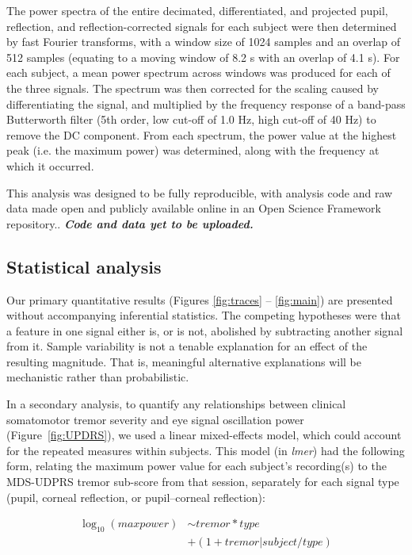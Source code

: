 \documentclass[jou,a4paper]{apa6}
\begin{document}
The power spectra of the entire decimated, differentiated, and projected pupil, reflection, and reflection-corrected signals for each subject were then determined by fast Fourier transforms, with a window size of 1024 samples and an overlap of 512 samples (equating to a moving window of 8.2 s with an overlap of 4.1 s). For each subject, a mean power spectrum across windows was produced for each of the three signals. The spectrum was then corrected for the scaling caused by differentiating the signal, and multiplied by the frequency response of a band-pass Butterworth filter (5th order, low cut-off of 1.0 Hz, high cut-off of 40 Hz) to remove the DC component. From each spectrum, the power value at the highest peak (i.e. the maximum power) was determined, along with the frequency at which it occurred.

This analysis was designed to be fully reproducible, with analysis code and raw data made open and publicly available online in an Open Science Framework repository.\citep{MacAskill2016Investigating-o}. \textbf{\textit{Code and data yet to be uploaded.}}

\subsection{Statistical analysis}
Our primary quantitative results (Figures \ref{fig:traces} -- \ref{fig:main}) are presented without accompanying inferential statistics. The competing hypotheses were that a feature in one signal either is, or is not, abolished by subtracting another signal from it. Sample variability is not a tenable explanation for an effect of the resulting magnitude. That is, meaningful alternative explanations will be mechanistic rather than probabilistic.

In a secondary analysis, to quantify any relationships between clinical somatomotor tremor severity and eye signal oscillation power (Figure~\ref{fig:UPDRS}), we used a linear mixed-effects model, which could account for the repeated measures within subjects. This model (in \textit{lmer}) had the following form, relating the maximum power value for each subject's recording(s) to the MDS-UDPRS tremor sub-score from that session, separately for each signal type (pupil, corneal reflection, or pupil--corneal reflection): 


\begin{equation}\label{eq:model}
\begin{split}
\log_{10} (max power) & \sim tremor \ast type \\
 & + (1 + tremor | subject / type)
\end{split}
\end{equation}
\end{document}
